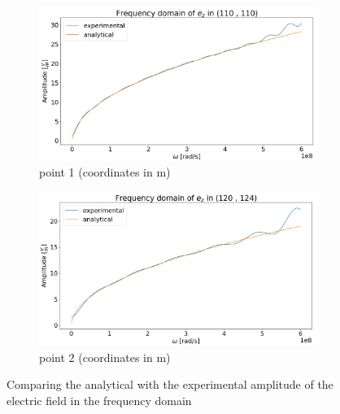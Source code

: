 \documentclass[11pt, a4paper]{article}
\begin{document}
\begin{figure}[H]
    \centering
    \begin{subfigure}{\textwidth}
        \includegraphics[width=0.95\linewidth]{fig/em_abs_hankel.png}
        \caption{point 1 (coordinates in m)}
        \label{fig:abs_code_validation}
    \end{subfigure}
    \begin{subfigure}{\textwidth}
        \includegraphics[width=0.95\linewidth]{fig/em_abs_hankel_point_2.png}
        \caption{point 2 (coordinates in m)}
        \label{fig:abs_code_validation_2}
    \end{subfigure}
    \caption{Comparing the analytical with the experimental amplitude of the electric field in the frequency domain}
\end{figure}
\end{document}
